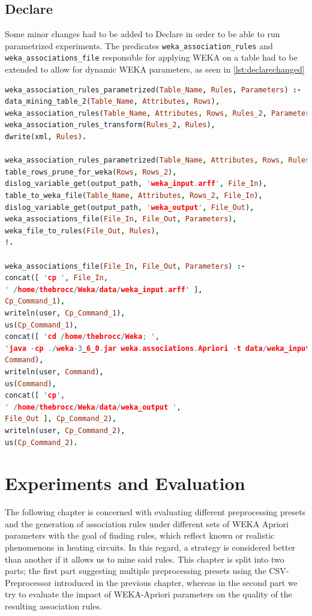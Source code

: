\documentclass[bachelor,english]{info1thesis}
\begin{document}
\section{Declare}

Some minor changes had to be added to Declare in order to be able to run parametrized experiments. The predicates \texttt{weka\_association\_rules} and \texttt{weka\_associations\_file} responsible for applying WEKA on a table had to be extended to allow for dynamic WEKA parameters, as seen in \ref{lst:declarechanged}

\begin{lstlisting}[language=Prolog, caption= Slightly extended predicates in the weka wrapper of Declare, label={lst:declarechanged}]
weka_association_rules_parametrized(Table_Name, Rules, Parameters) :-
data_mining_table_2(Table_Name, Attributes, Rows),
weka_association_rules(Table_Name, Attributes, Rows, Rules_2, Parameters),
weka_association_rules_transform(Rules_2, Rules),
dwrite(xml, Rules).

weka_association_rules_parametrized(Table_Name, Attributes, Rows, Rules, Parameters) :-
table_rows_prune_for_weka(Rows, Rows_2),
dislog_variable_get(output_path, 'weka_input.arff', File_In),
table_to_weka_file(Table_Name, Attributes, Rows_2, File_In),
dislog_variable_get(output_path, 'weka_output', File_Out),
weka_associations_file(File_In, File_Out, Parameters),
weka_file_to_rules(File_Out, Rules),
!.

weka_associations_file(File_In, File_Out, Parameters) :-
concat([ 'cp ', File_In,
' /home/thebrocc/Weka/data/weka_input.arff' ],
Cp_Command_1),
writeln(user, Cp_Command_1),
us(Cp_Command_1),
concat([ 'cd /home/thebrocc/Weka; ',
'java -cp ./weka-3_6_0.jar weka.associations.Apriori -t data/weka_input.arff ', Parameters, ' > data/weka_output' ],
Command),
writeln(user, Command),
us(Command),
concat([ 'cp',
' /home/thebrocc/Weka/data/weka_output ',
File_Out ], Cp_Command_2),
writeln(user, Cp_Command_2),
us(Cp_Command_2).
\end{lstlisting}







\chapter{Experiments and Evaluation}
\label{sec:evaluation}
The following chapter is concerned with evaluating different preprocessing presets and the generation of association rules under different sets of WEKA Apriori parameters with the goal of finding rules, which reflect known or realistic phenomenons in heating circuits. In this regard, a strategy is considered better than another if it allows us to mine said rules. This chapter is split into two parts; the first part suggesting multiple preprocessing presets using the CSV-Preprocessor introduced in the previous chapter, whereas in the second part we try to evaluate the impact of WEKA-Apriori parameters on the quality of the resulting association rules.
\end{document}
